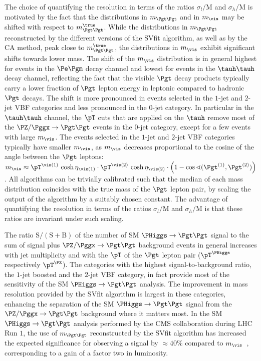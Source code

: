 The choice of quantifying the resolution in terms of the ratios $\sigma_{l}/\textrm{M}$ and $\sigma_{h}/\textrm{M}$ is motivated 
by the fact that the distributions in $m_{\Pgt\Pgt}$ and in $m_{\vis}$ may be shifted with respect to $m_{\Pgt\Pgt}^{\true}$.
While the distributions in $m_{\Pgt\Pgt}$ reconstructed by the different versions of the SVfit algorithm,
as well as by the CA method, peak close to $m_{\Pgt\Pgt}^{\true}$,
the distributions in $m_{\vis}$ exhibit significant shifts towards lower mass.
The shift of the $m_{\vis}$ distribution is in general highest for events in the $\Pe\Pgm$ decay channel and lowest for events in the $\tauh\tauh$ decay channel,
reflecting the fact that the visible $\Pgt$ decay products typically carry a lower fraction of $\Pgt$ lepton energy in leptonic compared to hadronic $\Pgt$ decays.
The shift is more pronounced in events selected in the $1$-jet and $2$-jet VBF categories and less pronounced in the $0$-jet category.
In particular in the $\tauh\tauh$ channel,
the $\pT$ cuts that are applied on the $\tauh$ remove most of the $\PZ/\Pggx \to \Pgt\Pgt$ events in the $0$-jet category,
except for a few events with large $m_{\vis}$.
The events selected in the $1$-jet and $2$-jet VBF categories typically have smaller $m_{\vis}$, as $m_{\vis}$ decreases proportional to the cosine of the angle between the $\Pgt$ leptons:
$m_{\vis} \approx \pT^{\vis(1)} \, \cosh\eta_{\vis(1)} \cdot \pT^{\vis(2)} \, \cosh\eta_{\vis(2)} \cdot \left( 1 - \cos\sphericalangle(\Pgt^{(1)},\Pgt^{(2)}) \right)$.
All algorithms can be trivially calibrated such that the median of each mass distribution coincides with the true mass of the $\Pgt$ lepton pair,
by scaling the output of the algorithm by a suitably chosen constant.
The advantage of quantifying the resolution in terms of the ratios $\sigma_{l}/\textrm{M}$ and $\sigma_{h}/\textrm{M}$ is that these ratios
are invariant under such scaling.

The ratio $\textrm{S}/(\textrm{S} + \textrm{B})$
of the number of SM $\PHiggs \to \Pgt\Pgt$ signal to the sum of signal plus $\PZ/\Pggx \to \Pgt\Pgt$ background events in general increases with jet multiplicity
and with the $\pT$ of the $\Pgt$ lepton pair ($\pT^{\PHiggs}$ respectively $\pT^{\PZ}$).
The categories with the highest signal-to-background ratio, the $1$-jet boosted and the $2$-jet VBF category,
in fact provide most of the sensitivity of the SM $\PHiggs \to \Pgt\Pgt$ analysis.
The improvement in mass resolution provided by the SVfit algorithm is largest in these categories,
enhancing the separation of the SM $\PHiggs \to \Pgt\Pgt$ signal from the $\PZ/\Pggx \to \Pgt\Pgt$ background where it matters most.
In the SM $\PHiggs \to \Pgt\Pgt$ analysis performed by the CMS collaboration during LHC Run $1$,
the use of $m_{\Pgt\Pgt}$ reconstructed by the SVfit algorithm has increased the expected significance for observing a signal by $\approx 40\%$ compared to $m_{\vis}$~\cite{HIG-13-004},
corresponding to a gain of a factor two in luminosity.

